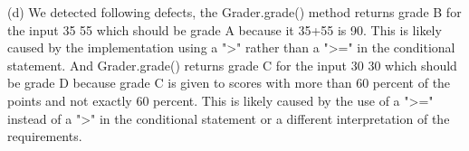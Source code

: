 \begin{parlist}
\item (d) We detected following defects, the Grader.grade() method returns grade B for the input 35 55 which should be grade A because it 35+55 is 90. This is likely caused by the implementation using a ">" rather than a ">=" in the conditional statement. And Grader.grade() returns grade C for the input 30 30 which should be grade D because grade C is given to scores with more than 60 percent of the points and not exactly 60 percent. This is likely caused by the use of a ">=" instead of a ">" in the conditional statement or a different interpretation of the requirements.

\end{parlist}

